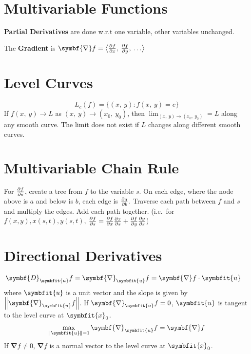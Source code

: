 \documentclass{article}
\begin{document}
\begin{multicols}{3}
    \section*{Multivariable Functions}
    \textbf{Partial Derivatives} are done w.r.t one variable, other variables unchanged.

    The \textbf{Gradient} is \(\symbf{\nabla}f = \avec[\big]{\pdv{f}{x},\: \pdv{f}{y},\: \dots}\)
    \section*{Level Curves}
    \begin{equation*}
        L_c\left( f \right) = \bigl\{ \left( x,\: y \right) : f\left(x,\: y\right) = c\bigr\}
    \end{equation*}
    If \(f(x,\: y) \to L\) as \((x,\: y) \to (x_0,\: y_0)\), then
    \(\displaystyle \lim_{(x,\: y) \to (x_0,\: y_0)} = L\) along any smooth
    curve. The limit does not exist if \(L\) changes along different smooth curves.

    \section*{Multivariable Chain Rule}
    For \(\pdv{f}{s}\), create a tree from \(f\) to the variable \(s\).
    On each edge, where the node above is \(a\) and below is \(b\), each edge is \(\pdv{a}{b}\).
    Traverse each path between \(f\) and \(s\) and multiply the edges.
    Add each path together.
    (i.e.\ for \(f(x, y), x(s,t), y(s,t)\), \(\pdv{f}{s} = \pdv{f}{x}\pdv{x}{s}+\pdv{f}{y}\pdv{y}{s}\))
    \section*{Directional Derivatives}
    \begin{align*}
        \symbf{D}_{\symbfit{u}}f = \symbf{\nabla}_{\symbfit{u}}f
         & = \symbf{\nabla}f \cdot \symbfit{u}
    \end{align*}
    where \(\symbfit{u}\) is a unit vector and the slope is given by \(\norm{\symbf{\nabla}_{\symbfit{u}}f}\).
    If \(\symbf{\nabla}_{\symbfit{u}}f=0\), \(\symbfit{u}\) is tangent to the level curve at \(\symbfit{x}_0\).
    \begin{align*}
        \max_{\norm{\symbfit{u}} = 1} \symbf{\nabla}_{\symbfit{u}}f = \symbf{\nabla}f
    \end{align*}
    If \(\symbf{\nabla}f\neq 0\), \(\symbf{\nabla}f\) is a normal vector to the level curve at \(\symbfit{x}_0\).

\end{multicols}
\end{document}
